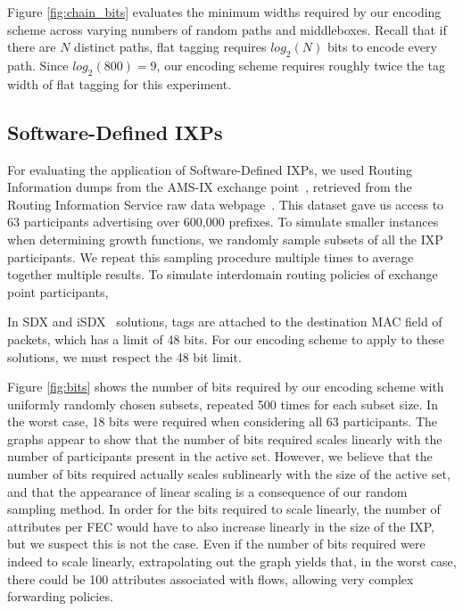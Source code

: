 Figure \ref{fig:chain_bits} evaluates the minimum widths required by our encoding scheme across varying numbers of random paths and middleboxes. Recall that if there are $N$ distinct paths, flat tagging requires $log_2(N)$ bits to encode every path. Since $log_2(800) = 9$, our encoding scheme requires roughly twice the tag width of flat tagging for this experiment. 


\subsection{Software-Defined IXPs}
For evaluating the application of Software-Defined IXPs, we used Routing Information dumps from the AMS-IX exchange point~\cite{ams-ix}, retrieved from the Routing Information Service raw data webpage~\cite{ris}. This dataset gave us access to 63 participants advertising over 600,000 prefixes. 
To simulate smaller instances when determining growth functions, we randomly sample subsets of all the IXP participants. We repeat this sampling procedure multiple times to average together multiple results. To simulate interdomain routing policies of exchange point participants, 

In SDX and iSDX~\cite{sdx, isdx} solutions, tags are attached to the destination MAC field of packets, which has a limit of 48 bits. For our encoding scheme to apply to these solutions, we must respect the 48 bit limit. 

Figure \ref{fig:bits} shows the number of bits required by our encoding scheme with uniformly randomly chosen subsets, repeated 500 times for each subset size. In the worst case, 18 bits were required when considering all 63 participants. The graphs appear to show that the number of bits required scales linearly with the number of participants present in the active set. However, we believe that the number of bits required actually scales sublinearly with the size of the active set, and that the appearance of linear scaling is a consequence of our random sampling method. In order for the bits required to scale linearly, the number of attributes per FEC would have to also increase linearly in the size of the IXP, but we suspect this is not the case. Even if the number of bits required were indeed to scale linearly, extrapolating out the graph yields that, in the worst case, there could be 100 attributes associated with flows, allowing very complex forwarding policies.

